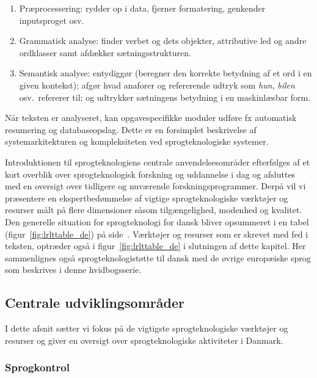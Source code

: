 \begin{multicols}{2}
\begin{enumerate}
  \item Pr\ae processering: rydder op i data, fjerner formatering, genkender inputsproget osv.
      \item Grammatisk analyse: finder verbet og dets objekter, attributive led og andre ordklasser samt afd\ae kker s\ae tningsstrukturen.
      \item Semantisk analyse: entydigg\o r (beregner den korrekte betydning af et ord i en given kontekst); afg\o r hvad anaforer og refererende udtryk som {\it hun}, {\it bilen} osv.\ refererer til; og udtrykker s\ae tningens betydning i en maskinl\ae sbar form.
\end{enumerate}

N\aa r teksten er analyseret, kan opgavespecifikke moduler udf\o re fx automatisk resumering og databaseopslag. Dette er en forsimplet beskrivelse af systemarkitekturen og kompleksiteten ved sprogteknologiske systemer.

Introduktionen til sprogteknologiens centrale anvendelsesomr\aa der efterf\o lges af et kort overblik over sprogteknologisk forskning og uddannelse i dag og afsluttes med en oversigt over tidligere og nuv\ae rende forskningsprogrammer. \mbox{Derp\aa} vil vi pr\ae sentere en ekspertbed\o mmelse af vigtige sprogteknologiske v\ae rkt\o jer og resurser m\aa lt \mbox{p\aa} flere dimensioner s\aa som tilg\ae ngelighed, modenhed og kvalitet. Den generelle situation for sprogteknologi for dansk bliver opsummeret i en tabel (figur~\ref{fig:lrlttable_de}) \mbox{p\aa} side~\pageref{fig:lrlttable_de}. V\ae rkt\o jer og resurser som er skrevet med fed i teksten, optr\ae der \mbox{ogs\aa} i figur~\ref{fig:lrlttable_de} i slutningen af dette kapitel. Her sammenlignes \mbox{ogs\aa} sprogteknologist\o tte til dansk med de \o vrige europ\ae iske sprog som beskrives i denne hvidbogsserie.


\subsection{Centrale udviklingsområder} 

I dette afsnit s\ae tter vi fokus \mbox{p\aa} de vigtigste sprogteknologiske v\ae rkt\o jer og resurser og giver en oversigt over sprogteknologiske aktiviteter i Danmark. 


\subsubsection{Sprogkontrol}


\end{multicols}
